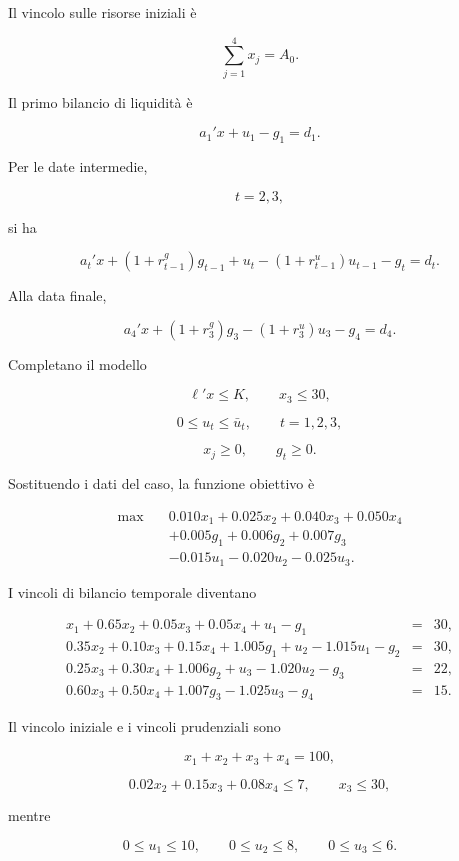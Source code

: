 Il vincolo sulle risorse iniziali \`e

\[
\sum_{j=1}^{4}x_j=A_0.
\]

Il primo bilancio di liquidit\`a \`e

\[
a_1'x+u_1-g_1=d_1.
\]

Per le date intermedie,

\[
t=2,3,
\]

\noindent si ha

\[
a_t'x
+
(1+r^g_{t-1})g_{t-1}
+
u_t
-
(1+r^u_{t-1})u_{t-1}
-
g_t
=
d_t.
\]

Alla data finale,

\[
a_4'x
+
(1+r_3^{g})g_3
-
(1+r_3^{u})u_3
-
g_4
=
d_4.
\]

Completano il modello

\[
\ell'x\leq K,
\qquad
x_3\leq30,
\]

\[
0\leq u_t\leq\bar u_t,
\qquad
t=1,2,3,
\]

\[
x_j\geq0,
\qquad
g_t\geq0.
\]

Sostituendo i dati del caso, la funzione obiettivo \`e

\[
\begin{split}
\max\quad
&
0.010x_1
+
0.025x_2
+
0.040x_3
+
0.050x_4
\\
&
+
0.005g_1
+
0.006g_2
+
0.007g_3
\\
&
-
0.015u_1
-
0.020u_2
-
0.025u_3.
\end{split}
\]

I vincoli di bilancio temporale diventano

\[
\begin{array}{rcl}
x_1
+0.65x_2
+0.05x_3
+0.05x_4
+u_1-g_1
&=&30,
\\[6pt]

0.35x_2
+0.10x_3
+0.15x_4
+1.005g_1
+u_2
-1.015u_1
-g_2
&=&30,
\\[6pt]

0.25x_3
+0.30x_4
+1.006g_2
+u_3
-1.020u_2
-g_3
&=&22,
\\[6pt]

0.60x_3
+0.50x_4
+1.007g_3
-1.025u_3
-g_4
&=&15.
\end{array}
\]

Il vincolo iniziale e i vincoli prudenziali sono

\[
x_1+x_2+x_3+x_4=100,
\]

\[
0.02x_2+0.15x_3+0.08x_4\leq7,
\qquad
x_3\leq30,
\]

\noindent mentre

\[
0\leq u_1\leq10,
\qquad
0\leq u_2\leq8,
\qquad
0\leq u_3\leq6.
\]

